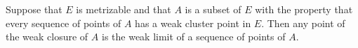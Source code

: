 Suppose that $E$ is metrizable and that $A$ is a subset of $E$ with the property that every sequence of points of $A$ has a weak cluster point in $E$. Then any point of the weak closure of $A$ is the weak limit of a sequence of points of $A$.
